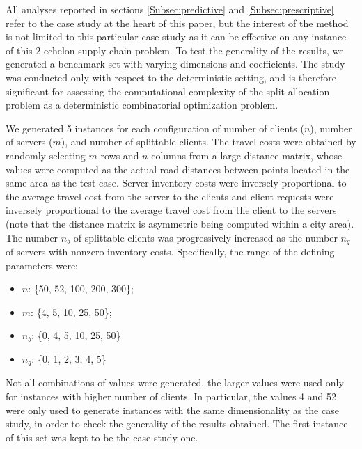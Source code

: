 \documentclass[ijoc,sglanonrev]{informs4}
\begin{document}
All analyses reported in sections \ref{Subsec:predictive} and \ref{Subsec:prescriptive} refer to the case study at the heart of this paper, but the interest of the method is not limited to this particular case study as it can be effective on any instance of this 2-echelon supply chain problem. To test the generality of the results, we generated a benchmark set with varying dimensions and coefficients. The study was conducted only with respect to the deterministic setting, and is therefore significant for assessing the computational complexity of the split-allocation problem as a deterministic combinatorial optimization problem.

We generated 5 instances for each configuration of number of clients ($n$), number of servers ($m$), and number of splittable clients. The travel costs were obtained by randomly selecting $m$ rows and $n$ columns from a large distance matrix, whose values were computed as the actual road distances between points located in the same area as the test case. Server inventory costs were inversely proportional to the average travel cost from the server to the clients and client requests were inversely proportional to the average travel cost from the client to the servers (note that the distance matrix is asymmetric being computed within a city area). The number $n_b$ of splittable clients was progressively increased as the number $n_q$ of servers with nonzero inventory costs. Specifically, the range of the defining parameters were:
\begin{itemize}
    \item $n$: \{50, 52, 100, 200, 300\};
    \item $m$: \{4, 5, 10, 25, 50\};
    \item $n_b$: \{0, 4, 5, 10, 25, 50\}
    \item $n_q$: \{0, 1, 2, 3, 4, 5\}
\end{itemize}

Not all combinations of values were generated, the larger values were used only for instances with higher number of clients. In particular, the values 4 and 52 were only used to generate instances with the same dimensionality as the case study, in order to check the generality of the results obtained. The first instance of this set was kept to be the case study one.
\end{document}

